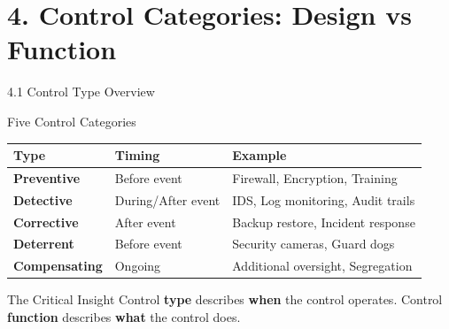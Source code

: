 \documentclass{beamer}
\begin{document}
	\section{4. Control Categories: Design vs Function}
	
	\begin{frame}{4.1 Control Type Overview}
		\begin{block}{Five Control Categories}
			\begin{tabular}{|p{2.5cm}|p{4cm}|p{4.5cm}|}
				\hline
				\textbf{Type} & \textbf{Timing} & \textbf{Example} \\
				\hline
				\textbf{Preventive} & Before event & Firewall, Encryption, Training \\
				\hline
				\textbf{Detective} & During/After event & IDS, Log monitoring, Audit trails \\
				\hline
				\textbf{Corrective} & After event & Backup restore, Incident response \\
				\hline
				\textbf{Deterrent} & Before event & Security cameras, Guard dogs \\
				\hline
				\textbf{Compensating} & Ongoing & Additional oversight, Segregation \\
				\hline
			\end{tabular}
		\end{block}
		
		\begin{alertblock}{The Critical Insight}
			Control \textbf{type} describes \textbf{when} the control operates. Control \textbf{function} describes \textbf{what} the control does.
		\end{alertblock}
	\end{frame}
	
\end{document}
